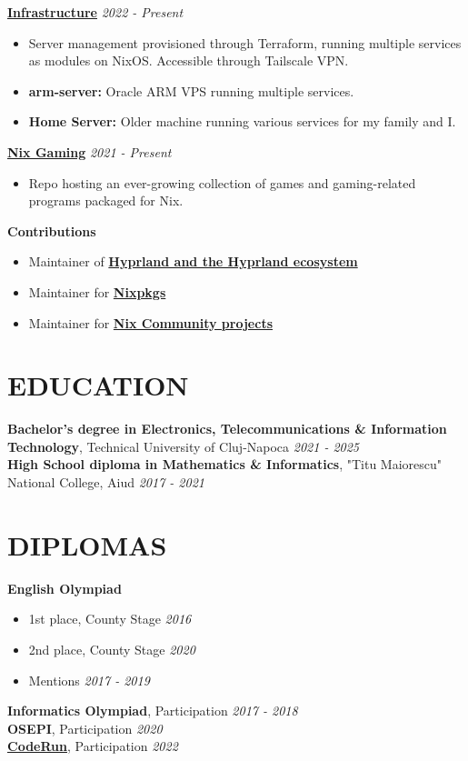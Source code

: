 \documentclass[margin]{res}
\begin{document}
\begin{resume}
  {\bf \href{https://github.com/fufexan/infra}{Infrastructure}} \hfill \textit{2022 - Present}\\
  \begin{itemize}
    \item Server management provisioned through Terraform, running multiple services as modules on NixOS. Accessible through Tailscale VPN.
    \item \textbf{arm-server:} Oracle ARM VPS running multiple services.
    \item \textbf{Home Server:} Older machine running various services for my family and I.
  \end{itemize}

  {\bf \href{https://github.com/fufexan/nix-gaming}{Nix Gaming}} \hfill \textit{2021 - Present}\\
  \begin{itemize}
    \item Repo hosting an ever-growing collection of games and gaming-related programs packaged for Nix.
  \end{itemize}

  {\bf Contributions}
  \begin{itemize}
    \item Maintainer of \href{https://github.com/hyprwm}{\textbf{Hyprland and the Hyprland ecosystem}}
    \item Maintainer for \href{https://github.com/nixos/nixpkgs}{\textbf{Nixpkgs}}
    \item Maintainer for \href{https://github.com/nix-community}{\textbf{Nix Community projects}}
  \end{itemize}

  \section{EDUCATION}
  {\bf Bachelor's degree in Electronics, Telecommunications \& Information Technology}, Technical University of Cluj-Napoca \hfill \textit{2021 - 2025}\\
  {\bf High School diploma in Mathematics \& Informatics}, "Titu Maiorescu" National College, Aiud \hfill \textit{2017 - 2021}\\

  \section{DIPLOMAS}
  {\bf English Olympiad}
  \begin{itemize}
    \item 1st place, County Stage \hfill \textit{2016}
    \item 2nd place, County Stage \hfill \textit{2020}
    \item Mentions \hfill \textit{2017 - 2019}
  \end{itemize}
  {\bf Informatics Olympiad}, Participation \hfill \textit{2017 - 2018}\\
  {\bf OSEPI}, Participation \hfill \textit{2020}\\
  {\href{https://drive.google.com/file/d/1-J-29m5L9CdteR9kHYx2MyP3JnUd7z8m/view}{\textbf{CodeRun}}, Participation \hfill \textit{2022}}\\


\end{resume}
\end{document}
